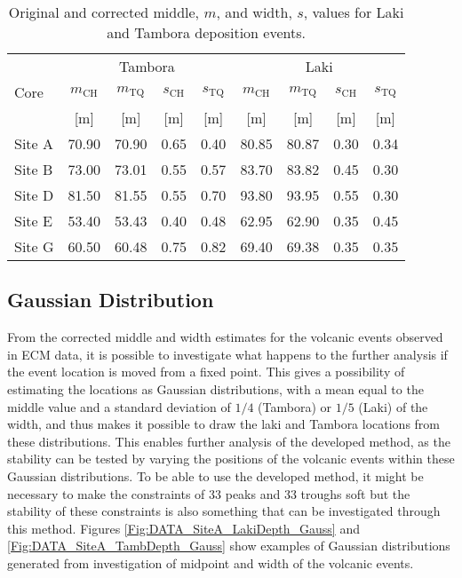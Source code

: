 \documentclass[../../CompleteThesis2/Complete_2ndDraft]{subfiles}
\begin{document}
\begin{table}[h]
	\centering
	\begin{tabular}{l||cc|cc||cc|cc||}
		& \multicolumn{4}{c||}{Tambora} & \multicolumn{4}{c||}{Laki}\\
		Core & $m_{\text{CH}}$ & $m_{\text{TQ}}$ & $s_{\text{CH}}$ & $s_{\text{TQ}}$& $m_{\text{CH}}$ & $m_{\text{TQ}}$ & $s_{\text{CH}}$ & $s_{\text{TQ}}$ \\
		 & [m] & [m] & [m] & [m]& [m] & [m] & [m] & [m] \\
		\hline
		Site A & 70.90 & 70.90 & 0.65 & 0.40 & 80.85 & 80.87 & 0.30 & 0.34 \\
		Site B & 73.00 & 73.01 & 0.55 & 0.57 & 83.70 & 83.82 & 0.45 & 0.30 \\	
		Site D & 81.50 & 81.55 & 0.55 & 0.70 & 93.80 & 93.95 & 0.55 & 0.30 \\
		Site E & 53.40 & 53.43 & 0.40 & 0.48 & 62.95 & 62.90 & 0.35 & 0.45 \\
		Site G & 60.50 & 60.48 & 0.75 & 0.82 & 69.40 & 69.38 & 0.35 & 0.35 \\
	\end{tabular}
	\caption{\footnotesize Original and corrected middle, $m$, and width, $s$, values for Laki and Tambora deposition events.}
	\label{Tab:LakiTamb_corr}
\end{table}



\subsection[Gaussian Distribution]{Gaussian Distribution}
\label{Subsec:Data_VolcanicHorizons_GaussDist}


From the corrected middle and width estimates for the volcanic events observed in ECM data, it is possible to investigate what happens to the further analysis if the event location is moved from a fixed point. This gives a possibility of estimating the locations as Gaussian distributions, with a mean equal to the middle value and a standard deviation of $1/4$ (Tambora) or $1/5$ (Laki) of the width, and thus makes it possible to draw the laki and Tambora locations from these distributions. This enables further analysis of the developed method, as the stability can be tested by varying the positions of the volcanic events within these Gaussian distributions. To be able to use the developed method, it might be necessary to make the constraints of 33 peaks and 33 troughs soft but the stability of these constraints is also something that can be investigated through this method. Figures \ref{Fig:DATA_SiteA_LakiDepth_Gauss} and \ref{Fig:DATA_SiteA_TambDepth_Gauss} show examples of Gaussian distributions generated from investigation of midpoint and width of the volcanic events. 
\end{document}
